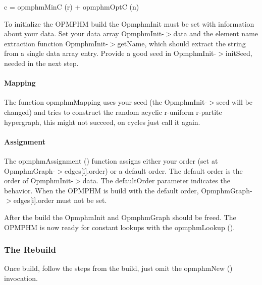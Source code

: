 {\ttfamily c = opmphm\+MinC (r) + opmphm\+OptC (n)}

To initialize the O\+P\+M\+P\+HM build the {\ttfamily Opmphm\+Init} must be set with information about your data. Set your data array {\ttfamily Opmphm\+Init-\/$>$data} and the element name extraction function {\ttfamily Opmphm\+Init-\/$>$get\+Name}, which should extract the string from a single data array entry. Provide a good seed in {\ttfamily Opmphm\+Init-\/$>$init\+Seed}, needed in the next step.

\paragraph*{Mapping}

The function {\ttfamily opmphm\+Mapping} uses your seed (the {\ttfamily Opmphm\+Init-\/$>$seed} will be changed) and tries to construct the random acyclic r-\/uniform r-\/partite hypergraph, this might not succeed, on cycles just call it again.

\paragraph*{Assignment}

The {\ttfamily opmphm\+Assignment ()} function assigns either your order (set at {\ttfamily Opmphm\+Graph-\/$>$edges\mbox{[}i\mbox{]}.order}) or a default order. The default order is the order of {\ttfamily Opmphm\+Init-\/$>$data}. The {\ttfamily default\+Order} parameter indicates the behavior. When the O\+P\+M\+P\+HM is build with the default order, {\ttfamily Opmphm\+Graph-\/$>$edges\mbox{[}i\mbox{]}.order} must not be set.

After the build the Opmphm\+Init and Opmphm\+Graph should be freed. The O\+P\+M\+P\+HM is now ready for constant lookups with the {\ttfamily opmphm\+Lookup ()}.

\subsubsection*{The Rebuild}

Once build, follow the steps from the build, just omit the {\ttfamily opmphm\+New ()} invocation. 